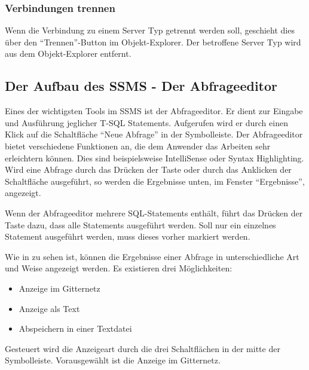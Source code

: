         \subsubsection{Verbindungen trennen}
          Wenn die Verbindung zu einem Server Typ getrennt werden soll,
          geschieht dies über den \enquote{Trennen}-Button im Objekt-Explorer.
          Der betroffene Server Typ wird aus dem Objekt-Explorer entfernt.
      \subsection{Der Aufbau des SSMS - Der Abfrageeditor}
        Eines der wichtigsten Tools im SSMS ist der Abfrageeditor. Er dient zur
        Eingabe und Ausführung jeglicher T-SQL Statements. Aufgerufen wird er
        durch einen Klick auf die Schaltfläche \enquote{Neue Abfrage} in der
        Symbolleiste.
        Der Abfrageeditor bietet verschiedene Funktionen an, die dem Anwender
        das Arbeiten sehr erleichtern können. Dies sind beispielsweise 
        IntelliSense oder Syntax Highlighting.
        Wird eine Abfrage durch das Drücken der Taste  oder durch
        das Anklicken der Schaltfläche  ausgeführt, so
        werden die Ergebnisse unten, im Fenster \enquote{Ergebnisse}, angezeigt.
\clearpage
        \begin{merke}
          Wenn der Abfrageeditor mehrere SQL-Statements enthält, führt das
          Drücken der Taste  dazu, dass alle Statements
          ausgeführt werden. Soll nur ein einzelnes Statement ausgeführt werden,
          muss dieses vorher markiert werden.
        \end{merke}
        Wie in  zu sehen ist, können
        die Ergebnisse einer Abfrage in unterschiedliche Art und Weise angezeigt
        werden. Es existieren drei Möglichkeiten:
        \begin{itemize}
          \item Anzeige im Gitternetz
          \item Anzeige als Text
          \item Abspeichern in einer Textdatei
        \end{itemize}
        Gesteuert wird die Anzeigeart durch die drei Schaltflächen in der mitte
        der Symbolleiste. Vorausgewählt ist die Anzeige im Gitternetz.
